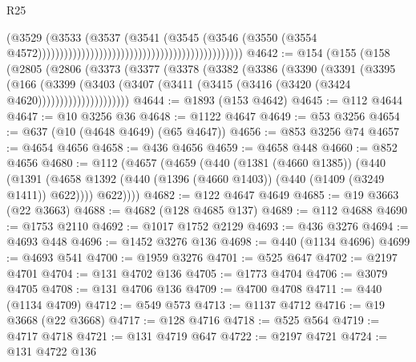 \begin{lexlean}{R25}
\begin{coremodule}
                                                                                  (@3529
                                                                                    (@3533
                                                                                      (@3537
                                                                                        (@3541
                                                                                          (@3545
                                                                                            (@3546
                                                                                              (@3550
                                                                                                (@3554
                                                                                                  @4572)))))))))))))))))))))))))))))))))))))))))))))))
@4642 := @154
    (@155
      (@158
        (@2805
          (@2806
            (@3373
              (@3377
                (@3378
                  (@3382
                    (@3386
                      (@3390
                        (@3391
                          (@3395
                            (@166
                              (@3399
                                (@3403
                                  (@3407
                                    (@3411 (@3415 (@3416 (@3420 (@3424 @4620)))))))))))))))))))))
@4644 := @1893 (@153 @4642)
@4645 := @112 @4644
@4647 := @10 @3256 @36
@4648 := @1122 @4647
@4649 := @53 @3256
@4654 := @637 (@10 (@4648 @4649) (@65 @4647))
@4656 := @853 @3256 @74
@4657 := @4654 @4656
@4658 := @436 @4656
@4659 := @4658 @448
@4660 := @852 @4656
@4680 := @112
    (@4657
      (@4659
        (@440
          (@1381 (@4660 @1385))
          (@440
            (@1391 (@4658 @1392 (@440 (@1396 (@4660 @1403)) (@440 (@1409 (@3249 @1411)) @622))))
            @622))))
@4682 := @122 @4647 @4649
@4685 := @19 @3663 (@22 @3663)
@4688 := @4682 (@128 @4685 @137)
@4689 := @112 @4688
@4690 := @1753 @2110
@4692 := @1017 @1752 @2129
@4693 := @436 @3276
@4694 := @4693 @448
@4696 := @1452 @3276 @136
@4698 := @440 (@1134 @4696)
@4699 := @4693 @541
@4700 := @1959 @3276
@4701 := @525 @647
@4702 := @2197 @4701
@4704 := @131 @4702 @136
@4705 := @1773 @4704
@4706 := @3079 @4705
@4708 := @131 @4706 @136
@4709 := @4700 @4708
@4711 := @440 (@1134 @4709)
@4712 := @549 @573
@4713 := @1137 @4712
@4716 := @19 @3668 (@22 @3668)
@4717 := @128 @4716
@4718 := @525 @564
@4719 := @4717 @4718
@4721 := @131 @4719 @647
@4722 := @2197 @4721
@4724 := @131 @4722 @136

\end{coremodule}
\end{lexlean}
